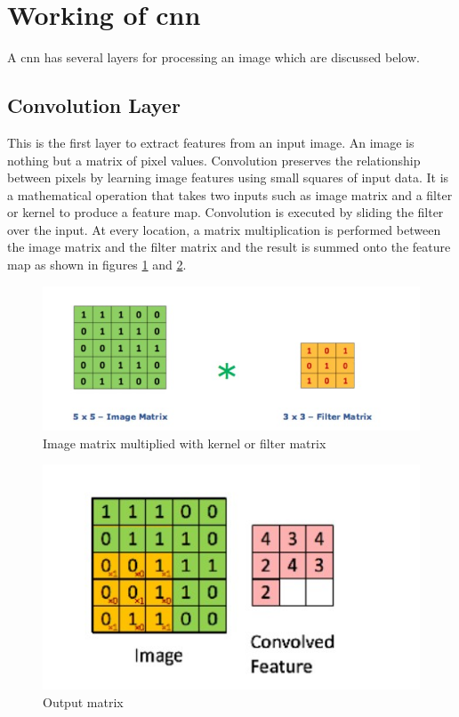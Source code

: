 \section{Working of \acrlong{cnn}}
A \acrshort{cnn} has several layers for processing an image which are discussed below.
\subsection{Convolution Layer}
This is the first layer to extract features from an input image. An image is nothing but a matrix of pixel values. Convolution preserves the relationship between pixels by learning image features using small squares of input data. It is a mathematical operation that takes two inputs such as image matrix and a filter or kernel to produce a feature map. Convolution is executed by sliding the filter over the input. At every location, a matrix multiplication is performed between the image matrix and the filter matrix and the result is summed onto the feature map as shown in figures \ref{fig:imagemat} and \ref{fig:outputmat}. 

\begin{figure}[H]
\centering
	\includegraphics[scale=1]{Chapter2/img_mat_mul_kernel_filter_matrix.jpg}	
	\caption{Image matrix multiplied with kernel or filter matrix}
	\label{fig:imagemat}
\end{figure}
\begin{figure}[H]
\centering
	\includegraphics[scale=1]{Chapter2/output_mat.jpg}	
	\caption{Output matrix}
	\label{fig:outputmat}
\end{figure}

